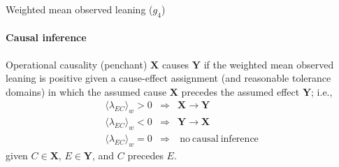 \documentclass{beamer}
\begin{document}
\begin{frame}{Weighted mean observed leaning ($g_4$)}
\framesubtitle{Causal inference}
\begin{block}{Operational causality (penchant)}
$\mathbf{X}$ causes $\mathbf{Y}$ if the weighted mean observed leaning is positive given a cause-effect assignment (and reasonable tolerance domains) in which the assumed cause $\mathbf{X}$ precedes the assumed effect $\mathbf{Y}$; i.e.,
\begin{eqnarray*}
\langle\lambda_{EC}\rangle_w>0&\Rightarrow& \mathbf{X}\rightarrow\mathbf{Y}\\
\langle\lambda_{EC}\rangle_w<0&\Rightarrow& \mathbf{Y}\rightarrow\mathbf{X}\\
\langle\lambda_{EC}\rangle_w=0&\Rightarrow& \mathrm{\ no\ causal\ inference}
\end{eqnarray*}
given $C\in\mathbf{X}$, $E\in\mathbf{Y}$, and $C$ precedes $E$.\\
\end{block}
\end{frame}
\end{document}
